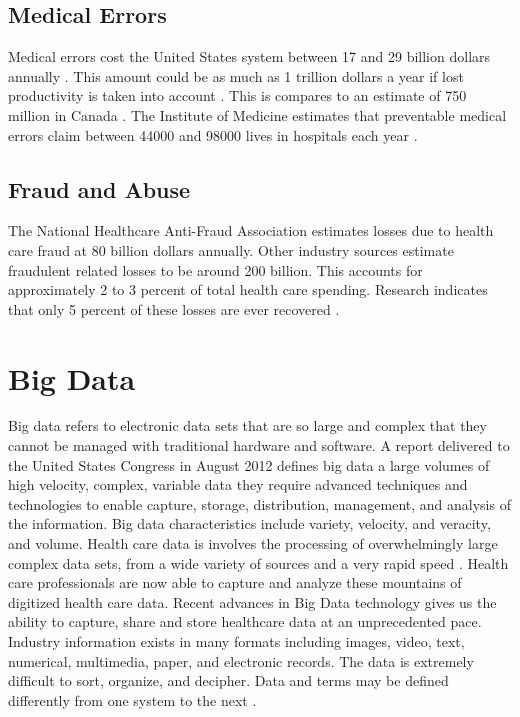 \documentclass[sigconf]{acmart}
\begin{document}
\subsection{Medical Errors}
Medical errors cost the United States system between 17 and 29 billion dollars annually \cite{milbank}. This amount could be as much as 1 trillion dollars a year if lost productivity is taken into account \cite{www-google-pracfus}. This is compares to an estimate of 750 million in Canada \cite{milbank}.  The Institute of Medicine estimates that preventable medical errors claim between 44000 and 98000 lives in hospitals each year \cite{milbank}.

\subsection{Fraud and Abuse}
The National Healthcare Anti-Fraud Association estimates losses due to health care fraud at 80 billion dollars annually. Other industry sources estimate fraudulent related losses to be around 200 billion. This accounts for approximately 2 to 3 percent of total health care spending. Research indicates that only 5 percent of these losses are ever recovered \cite{www-google-datameer}.

\section{Big Data}

Big data refers to electronic data sets that are so large and complex that they cannot be managed with traditional hardware and software. A report delivered to the United States Congress in August 2012 defines big data a large volumes of high velocity, complex, variable data they require advanced techniques and technologies to enable capture, storage, distribution, management, and analysis of the information. Big data characteristics include variety, velocity, and veracity, and volume.  Health care data is involves the processing of overwhelmingly large complex data sets, from a wide variety of sources and a very rapid speed \cite{springer}.  Health care professionals are now able to capture and analyze these mountains of digitized health care data. Recent advances in Big Data technology gives us the ability to capture, share and store healthcare data at an unprecedented pace. Industry information exists in many formats including images, video, text, numerical, multimedia, paper, and electronic records. The data is extremely difficult to sort, organize, and decipher.  Data and terms may be defined differently from one system to the next \cite{www-google-digit}.
\end{document}
